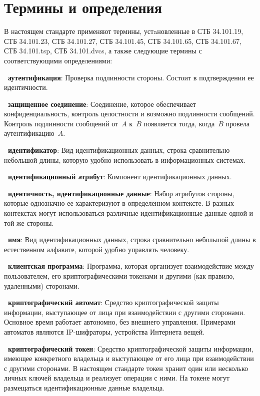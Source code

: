 \chapter{Термины и определения}

В настоящем стандарте применяют термины, устaновленные в СТБ 34.101.19,
СТБ 34.101.23, СТБ 34.101.27, СТБ 34.101.45, СТБ 34.101.65, 
СТБ 34.101.67, СТБ 34.101.tsp, СТБ 34.101.dvcs, а также следующие термины с 
соответствующими определениями:

{\bf \thedefctr~аутентификация}:
Проверка подлинности стороны.
Состоит в подтверждении ее идентичности.

{\bf \thedefctr~защищенное соединение}:
Соединение, которое обеспечивает конфиденциальность, 
контроль целостности и возможно подлинности сообщений. 
%
Контроль подлинности сообщений от~$A$ к~$B$ появляется тогда,
когда~$B$ провела аутентификацию~$A$.

{\bf \thedefctr~идентификатор}:
Вид идентификационных данных, строка сравнительно небольшой длины,
которую удобно использовать в информационных системах. 

{\bf \thedefctr~идентификационный атрибут}:
Компонент идентификационных данных. 

{\bf \thedefctr~идентичность, идентификационные данные}:
Набор атрибутов стороны, которые однозначно ее характеризуют в 
определенном контексте. В разных контекстах могут использоваться 
различные идентификационные данные одной и той же стороны.

{\bf \thedefctr~имя}:
Вид идентификационных данных, строка сравнительно небольшой длины
в естественном алфавите, которой удобно управлять человеку.

{\bf \thedefctr~клиентская программа}:
Программа, которая организует взаимодействие между 
пользователем, его криптографическими токенами и другими 
(как правило, удаленными) сторонами.

{\bf\thedefctr~криптографический автомат}: 
Средство криптографической защиты информации, выступающее от 
 лица при взаимодействии с другими сторонами.
%
Основное время работает автономно, без внешнего управления.
%
Примерами автоматов являются IP-шифраторы, устройства Интернета вещей.

{\bf\thedefctr~криптографический токен}: 
Средство криптографической защиты информации, имеющее конкретного 
владельца и выступающее от его лица при взаимодействии с другими 
сторонами. 
%
В настоящем стандарте токен хранит один или несколько личных ключей 
владельца и реализует операции с ними.  
%
На токене могут размещаться идентификационные данные владельца. 

